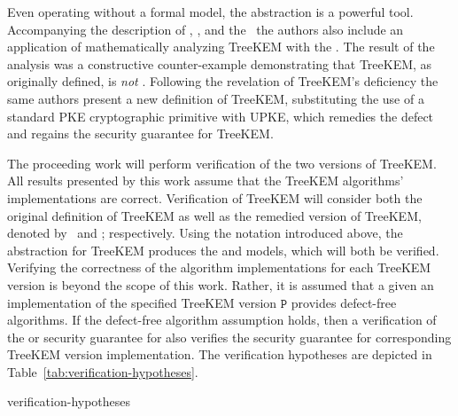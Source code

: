 Even operating without a formal model, the  abstraction is a powerful tool.
Accompanying the description of , \CGKAdef, and the \CGKAsec\ the authors also include an application of mathematically analyzing TreeKEM with the \CGKAsec.
The result of the analysis was a constructive counter-example demonstrating that TreeKEM, as originally defined, is \emph{not} .
Following the revelation of TreeKEM's deficiency the same authors present a new definition of TreeKEM, substituting the use of a standard PKE cryptographic primitive with UPKE, which remedies the defect and regains the  security guarantee for TreeKEM.\@

The proceeding work will perform verification of the two versions of TreeKEM.\@
All results presented by this work assume that the TreeKEM algorithms' implementations are correct.
Verification of TreeKEM will consider both the original definition of TreeKEM as well as the remedied version of TreeKEM, denoted by \VersionOne\ and \VersionTwo; respectively.
Using the notation introduced above, the  abstraction for TreeKEM produces the \CGKAmod{\VersionOne}{}{} and \CGKAmod{\VersionTwo}{}{} models, which will both be verified.
Verifying the correctness of the  algorithm implementations for each TreeKEM version is beyond the scope of this work.
Rather, it is assumed that a given an implementation of the specified TreeKEM version \(\mathtt{P}\) provides defect-free algorithms.
If the defect-free algorithm assumption holds, then a verification of the  or  security guarantee for  also verifies the security guarantee for corresponding TreeKEM version implementation.
The verification hypotheses are depicted in Table\ \ref{tab:verification-hypotheses}.

\begin{table}[ht!]                                                                                                                      
\caption{%
\label{tab:verification-hypotheses}%
Verification Hypotheses of .
}%
{verification-hypotheses}
\end{table}
